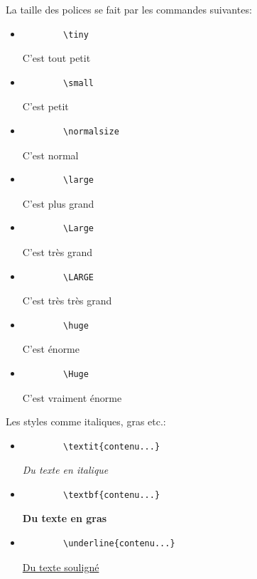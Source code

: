 \documentclass[11pt,a4paper]{article}
\begin{document}
	La taille des polices se fait par les commandes suivantes:
	\begin{itemize}
		\item \begin{verbatim}
		\tiny
		\end{verbatim}
		{\tiny C'est tout petit}
		
		\item \begin{verbatim}
		\small
		\end{verbatim}
		{\small C'est petit}
		
		\item \begin{verbatim}
		\normalsize
		\end{verbatim}
		{\normalsize C'est normal}
		
		\item \begin{verbatim}
		\large
		\end{verbatim}
		{\large C'est plus grand}
		
		\item \begin{verbatim}
		\Large
		\end{verbatim}
		{\Large C'est très grand}
		
		\item \begin{verbatim}
		\LARGE
		\end{verbatim}
		{\LARGE C'est très très grand}
		
		\item \begin{verbatim}
		\huge
		\end{verbatim}
		{\huge C'est énorme}
		
		\item \begin{verbatim}
		\Huge
		\end{verbatim}
		{\Huge C'est vraiment énorme}
		\newline
	\end{itemize}


	Les styles comme italiques, gras etc.:
	\begin{itemize}
		\item \begin{verbatim}
		\textit{contenu...}
		\end{verbatim}
		\textit{Du texte en italique}
		
		\item \begin{verbatim}
		\textbf{contenu...}
		\end{verbatim}
		\textbf{Du texte en gras}
		
		\item \begin{verbatim}
		\underline{contenu...}
		\end{verbatim}
		\underline{Du texte souligné}
		\newline
	\end{itemize}
\end{document}
